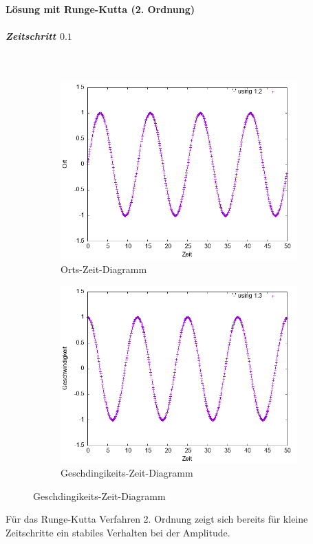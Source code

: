 \documentclass[
    oneside,
    ngerman,
    footinclude=false,
    captions=tableheading,
    DIV=12
]{scrartcl}
\begin{document}
        \paragraph*{Lösung mit Runge-Kutta (2. Ordnung)}
            \subparagraph*{Zeitschritt $0.1$}\,
            \begin{figure}[H]
                \centering
                \begin{subfigure}[b]{0.45\textwidth}
                    \centering
                    \includegraphics[width=\textwidth]{Bilddateien/RK2A1(a)-01-0-x.png}
                    \caption{Orts-Zeit-Diagramm}
                    \label{fig:RK2A1(a)-01-0-x}
                \end{subfigure}
                \hfill
                \begin{subfigure}[b]{0.45\textwidth}
                    \centering
                    \includegraphics[width=\textwidth]{Bilddateien/RK2A1(a)-01-0-v.png}
                    \caption{Geschdingikeits-Zeit-Diagramm}
                    \label{fig:RK2A1(a)-01-0-v}
                \end{subfigure}
            \end{figure}
            Für das Runge-Kutta Verfahren 2. Ordnung zeigt sich bereits für kleine Zeitschritte ein stabiles Verhalten bei der Amplitude.
        
\end{document}
